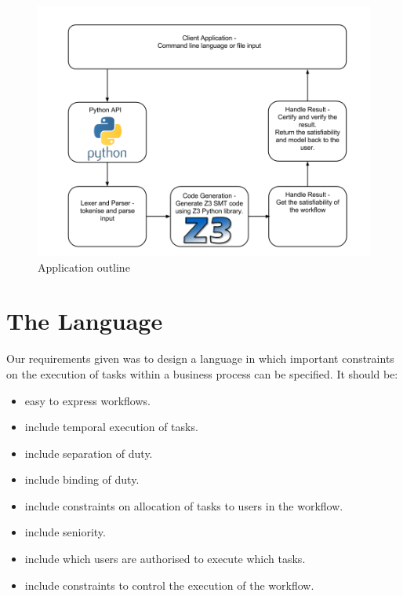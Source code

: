 \documentclass[a4paper]{report}
\begin{document}
\begin{figure}[!h]
\centering
\includegraphics[scale=0.5]{ApplicationDiagram.png}
\caption{Application outline}
\label{fig:Application outline}
\end{figure}

\section{The Language}
Our requirements given was to design a language in which important constraints on the execution of tasks within a business process can be specified. It should be:
\begin{itemize}
\item easy to express workflows.
\item include temporal execution of tasks.
\item include separation of duty.
\item include binding of duty.
\item include constraints on allocation of tasks to users in the workflow.
\item include seniority.
\item include which users are authorised to execute which tasks.
\item include constraints to control the execution of the workflow.
\end{itemize} 
\end{document}
